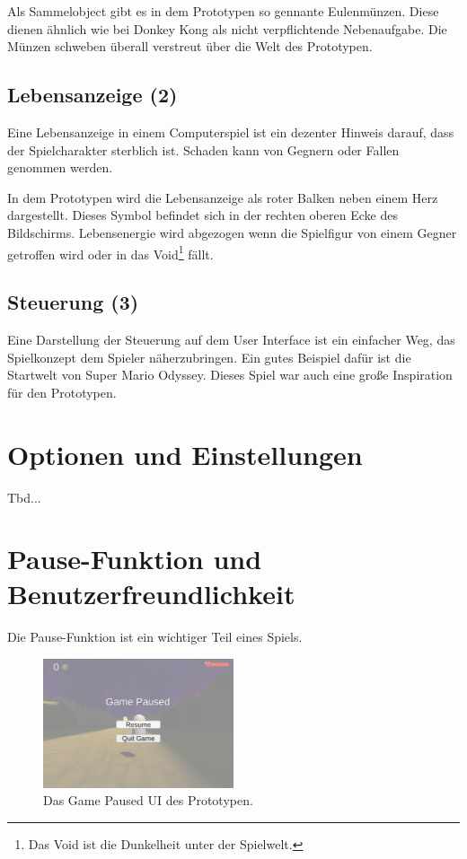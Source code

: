 Als Sammelobject gibt es in dem Prototypen so gennante \glqq Eulenmünzen\grqq. Diese dienen ähnlich wie bei Donkey Kong als nicht verpflichtende Nebenaufgabe. Die Münzen schweben überall verstreut über die Welt des Prototypen. 

\subsection{Lebensanzeige (2)}

Eine Lebensanzeige in einem Computerspiel ist ein dezenter Hinweis darauf, dass der Spielcharakter sterblich ist. Schaden kann von Gegnern oder Fallen genommen werden.

In dem Prototypen wird die Lebensanzeige als roter Balken neben einem Herz dargestellt. Dieses Symbol befindet sich in der rechten oberen Ecke des Bildschirms. Lebensenergie wird abgezogen wenn die Spielfigur von einem Gegner getroffen wird oder in das Void\footnote[1]{Das Void ist die Dunkelheit unter der Spielwelt.} fällt.

\subsection{Steuerung (3)}

Eine Darstellung der Steuerung auf dem User Interface ist ein einfacher Weg, das Spielkonzept dem Spieler näherzubringen. Ein gutes Beispiel dafür ist die Startwelt von Super Mario Odyssey. Dieses Spiel war auch eine große Inspiration für den Prototypen. 

\section{Optionen und Einstellungen}

Tbd...

\section{Pause-Funktion und Benutzerfreundlichkeit}
Die Pause-Funktion ist ein wichtiger Teil eines Spiels. 

\begin{figure}[H]
  \centering
  \includegraphics[width=0.5\textwidth]{chapters/03/images/GamePaused.png}
  \caption{Das Game Paused UI des Prototypen.}
  \label{luk01}
\end{figure}